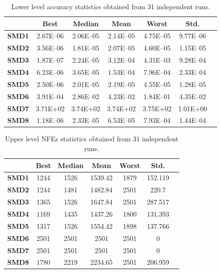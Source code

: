 \documentclass[conference]{IEEEtran}
\begin{document}
\begin{table}[!ht]
\renewcommand{\arraystretch}{1.3}
    \caption{Lower level accuracy statistics obtained from 31 independent runs.}
    \label{tab:ll-accuracy}
    \centering
    \begin{tabular}{|c|c|c|c|c|c|c|}
\hline
&\textbf{Best}&\textbf{Median}&\textbf{Mean}&\textbf{Worst}&\textbf{Std.}\\ \hline 
\textbf{SMD1} & 2.67E--06 & 2.06E--05 & 2.14E--05 & 4.75E--05 & 9.77E--06 \\ \hline 
\textbf{SMD2} & 3.56E--06 & 1.81E--05 & 2.07E--05 & 4.60E--05 & 1.15E--05 \\ \hline 
\textbf{SMD3} & 1.87E--07 & 2.24E--05 & 3.12E--04 & 4.31E--03 & 9.28E--04 \\ \hline 
\textbf{SMD4} & 6.23E--06 & 3.65E--05 & 1.53E--04 & 7.96E--04 & 2.33E--04 \\ \hline 
\textbf{SMD5} & 2.50E--06 & 2.01E--05 & 2.19E--05 & 4.55E--05 & 1.28E--05 \\ \hline 
\textbf{SMD6} & 3.91E--04 & 2.86E--02 & 4.23E--02 & 1.84E--01 & 4.35E--02 \\ \hline 
\textbf{SMD7} &  3.71E+02 &  3.74E+02 &  3.74E+02 &  3.75E+02 &  1.01E+00 \\ \hline 
\textbf{SMD8} & 1.18E--06 & 2.33E--05 & 6.53E--05 & 7.93E--04 & 1.44E--04 \\ \hline 

    \end{tabular}
\end{table}

\begin{table}[!ht]
\renewcommand{\arraystretch}{1.3}
    \caption{Upper level NFEs statistics obtained from 31 independent runs.}
    \label{tab:ul-fes}
    \centering
    \begin{tabular}{|c|c|c|c|c|c|c|}
\hline
&\textbf{Best}&\textbf{Median}&\textbf{Mean}&\textbf{Worst}&\textbf{Std.}\\ \hline 
\textbf{SMD1} & 1244 & 1526 & 1539.42 & 1879 & 152.119 \\ \hline
\textbf{SMD2} & 1244 & 1481 & 1482.84 & 2501 & 220.7   \\ \hline
\textbf{SMD3} & 1365 & 1526 & 1647.84 & 2501 & 287.517 \\ \hline
\textbf{SMD4} & 1169 & 1435 & 1437.26 & 1800 & 131.393 \\ \hline
\textbf{SMD5} & 1317 & 1526 & 1554.42 & 1898 & 137.766 \\ \hline
\textbf{SMD6} & 2501 & 2501 & 2501 &  2501 &   0   \\ \hline
\textbf{SMD7} & 2501 & 2501 & 2501 &  2501 &   0   \\ \hline
\textbf{SMD8} & 1780 & 2219 & 2234.65 & 2501 & 206.959 \\ \hline


    \end{tabular}
\end{table}
\end{document}
